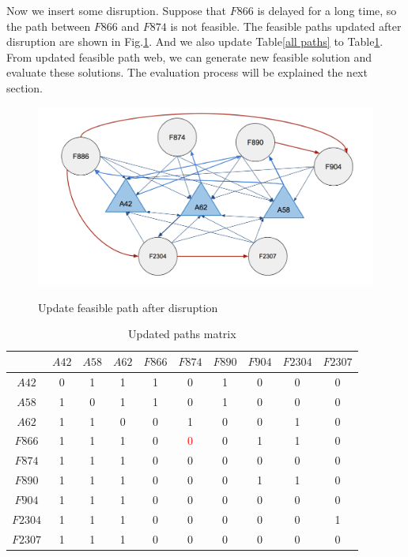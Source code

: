 \documentclass[senior]{IPSstyle}
\begin{document}
Now we insert some disruption.
Suppose that \(F866\) is delayed for a long time, so the path between \(F866\) and \(F874\) is not feasible. The feasible paths updated after disruption are shown in Fig.\ref{fig:disruption}. 
And we also update Table\ref{all paths} to Table\ref{table:updated paths}. From updated feasible path web, we can generate new feasible solution and evaluate these solutions. The evaluation process will be explained the next section.
\begin{figure}[h]
    \centering
    \includegraphics[width=15cm]{MasterThesis-master/updated-paths.png}\\
    \caption{Update feasible path after disruption}
    \label{fig:disruption}
\end{figure}

\begin{table}[h]
\renewcommand{\arraystretch}{1}
\begin{center}
\begin{tabular}{|c|c|c|c|c|c|c|c|c|c|}
\hline
\multicolumn{1}{|c|}{}
&\multicolumn{1}{|c|}{\(A42\)}
&\multicolumn{1}{c|}{\(A58\)}
&\multicolumn{1}{c|}{\(A62\)}
&\multicolumn{1}{|c|}{\(F866\)}
&\multicolumn{1}{c|}{\(F874\)}
&\multicolumn{1}{c|}{\(F890\)}
&\multicolumn{1}{c|}{\(F904\)}
&\multicolumn{1}{c|}{\(F2304\)}
&\multicolumn{1}{c|}{\(F2307\)}
\\  \hline
\(A42\) & 0 & 1 & 1 & 1 & 0 & 1 & 0 & 0 & 0
\\	\hline
\(A58\) & 1 & 0 & 1 & 1 & 0 & 1 & 0 & 0 & 0
\\	\hline
\(A62\) & 1 & 1 & 0 & 0 & 1 & 0 & 0 & 1 & 0
\\  \hline
\(F866\) & 1 & 1 & 1 & 0 & \textcolor{red}{0} & 0 & 1 & 1 & 0
\\	\hline
\(F874\) & 1 & 1 & 1 & 0 & 0 & 0 & 0 & 0 & 0
\\	\hline
\(F890\) & 1 & 1 & 1 & 0 & 0 & 0 & 1 & 1 & 0
\\  \hline
\(F904\) & 1 & 1 & 1 & 0 & 0 & 0 & 0 & 0 & 0
\\  \hline
\(F2304\) & 1 & 1 & 1 & 0 & 0 & 0 & 0 & 0 & 1
\\  \hline
\(F2307\) & 1 & 1 & 1 & 0 & 0 & 0 & 0 & 0 & 0
\\  \hline
\end{tabular}
\caption{Updated paths matrix}
\label{table:updated paths}
\end{center}
\end{table}
\end{document}
